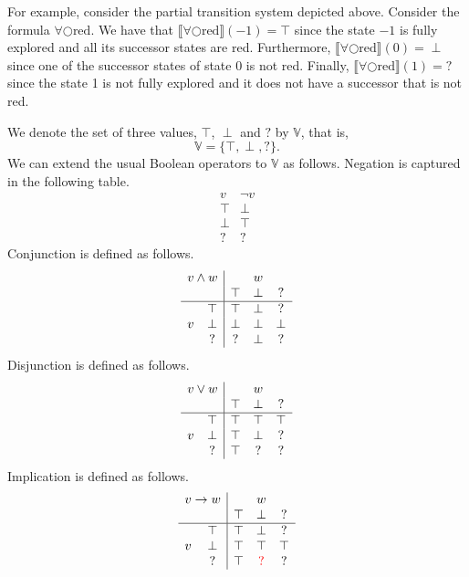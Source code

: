 \documentclass[12pt]{article}
\newcommand{\nxt}{\bigcirc}
\theoremstyle{definition}
\newcommand{\satisfaction}[1]{\llbracket #1 \rrbracket}
\newenvironment{franck}{\color{red}}{\color{black}}
\begin{document}
For example, consider the partial transition system depicted above.  Consider the formula $\forall \nxt \mbox{red}$.  We have that $\satisfaction{\forall \nxt \mbox{red}}(-1) = \top$ since the state $-1$ is fully explored and all its successor states are red.  Furthermore, $\satisfaction{\forall \nxt \mbox{red}}(0) = \perp$ since one of the  successor states of state 0 is not red.  Finally, $\satisfaction{\forall \nxt \mbox{red}}(1) = \mathord{?}$ since the state 1 is not fully explored and it does not have a successor that is not red.

We denote the set of three values, $\top$, $\perp$ and $?$ by $\mathbb{V}$, that is,
\[
\mathbb{V} = \{ \top, \perp, \mathord{?} \}.
\]
We can extend the usual Boolean operators to $\mathbb{V}$ as follows.  Negation is captured in the following table.
\[
\begin{array}{c|c}
v & \neg v\\\hline
\top & \perp\\
\perp & \top\\
\mathord{?} & \mathord{?}
\end{array}
\]
Conjunction is defined as follows.
\[
\begin{array}{cc|ccc}
\multicolumn{2}{c|}{v \wedge w} & & w &\\
&& \top & \perp & \mathord{?}\\\hline
& \top & \top & \perp & \mathord{?}\\
v & \perp & \perp & \perp & \perp\\
& \mathord{?} & \mathord{?} & \perp & \mathord{?}
\end{array}
\]
Disjunction is defined as follows.
\[
\begin{array}{cc|ccc}
\multicolumn{2}{c|}{v \vee w} & & w &\\
&& \top & \perp & \mathord{?}\\\hline
& \top & \top & \top & \top\\
v & \perp & \top & \perp & \mathord{?}\\
& \mathord{?} & \top & \mathord{?} & \mathord{?}
\end{array}
\]
Implication is defined as follows.
\[
\begin{array}{cc|ccc}
\multicolumn{2}{c|}{v \rightarrow w} & & w &\\
&& \top & \perp & \mathord{?}\\\hline
& \top & \top & \perp & ?\\
v & \perp & \top & \top & \top\\
& \mathord{?} & \top & \begin{franck}?\end{franck} & ?
\end{array}
\]
\end{document}

